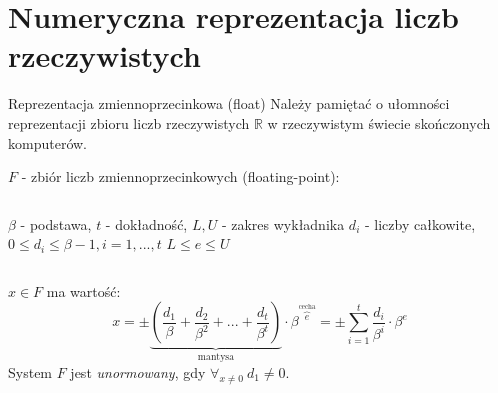\section{Numeryczna reprezentacja liczb rzeczywistych}
\begin{frame}{Reprezentacja zmiennoprzecinkowa (float)}
    Należy pamiętać o ułomności reprezentacji zbioru liczb rzeczywistych $\mathbb{R}$ w rzeczywistym świecie skończonych komputerów.
    \begin{block}{}
    $F$ - zbiór liczb zmiennoprzecinkowych (floating-point):\newline
    \begin{columns}
            $\beta$ - podstawa,\newline
            $t$ - dokładność,\newline
            $L, U$ - zakres wykładnika\newline
            $d_i$ - liczby całkowite,
            $0 \le d_i \le \beta - 1, i=1,...,t$
            $L \le e \le U$
    \end{columns}
    $x \in F$ ma wartość:
    \[
    x = \pm \underbrace{\left(\frac{d_1}{\beta} + \frac{d_2}{\beta^2} + ... + \frac{d_t}{\beta^t}\right)}_\text{mantysa} \cdot \beta^{\overbrace{e}^\text{cecha}}
    = \pm \sum_{i=1}^{t} \frac{d_i}{\beta^i} \cdot \beta^e
    \]        
    System $F$ jest {\it unormowany}, gdy $\forall_{x \ne 0}\ d_1 \ne 0$.
    \end{block}

\end{frame}

